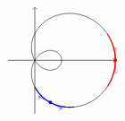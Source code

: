 \documentclass[10pt]{article}
\begin{document}
\[
  \begin{tikzpicture}[scale=3/4]
    \draw[->] (0, -2) -- (0, 2);
    \draw[->] (-1, 0) -- (3, 0);
    \draw[domain=0:360,smooth,variable=\t,samples=360]
      plot ({cos(\t) * (1 + 2 * cos(\t))},{sin(\t) * (1 + 2 * cos(\t))});
    \draw[domain=-20:20,smooth,variable=\t,color=red, thick,samples=40]
      plot ({cos(\t) * (1 + 2 * cos(\t))},{sin(\t) * (1 + 2 * cos(\t))});
    \draw[domain=270:310,smooth,variable=\t,color=blue, thick,samples=40]
      plot ({cos(\t) * (1 + 2 * cos(\t))},{sin(\t) * (1 + 2 * cos(\t))});
    \draw[<->, color = red] (3, -1/2) --
      node [midway, circle, fill = red, inner sep = 1pt] {} (3, 1/2);
    \draw[<->, color = blue] (0.135, -1.347) --
      node[midway, circle, fill = blue, inner sep = 1pt] {} (1.017, -1.818);
  \end{tikzpicture}
\]
\end{document}
